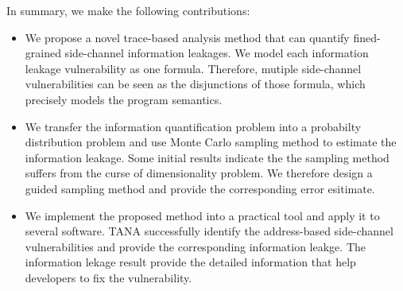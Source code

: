 In summary, we make the following contributions:

\begin{itemize}
	\item We propose a novel trace-based analysis method that can quantify fined-grained side-channel
        information leakages. We model each information leakage vulnerability as one formula. Therefore,
        mutiple side-channel vulnerabilities can be seen as the disjunctions of those formula, which
        precisely models the program semantics.
        \item We transfer the information quantification problem into a probabilty distribution problem and 
        use Monte Carlo sampling method to estimate the information leakage. Some initial results indicate the 
        the sampling method suffers from the curse of dimensionality problem. We therefore design a guided
        sampling method and provide the corresponding error esitimate.
	\item We implement the proposed method into a practical tool and apply it to several software. TANA 
        successfully identify the address-based side-channel vulnerabilities and provide the corresponding
        information leakge. The information lekage result provide the detailed information that help developers
        to fix the vulnerability.
\end{itemize}



